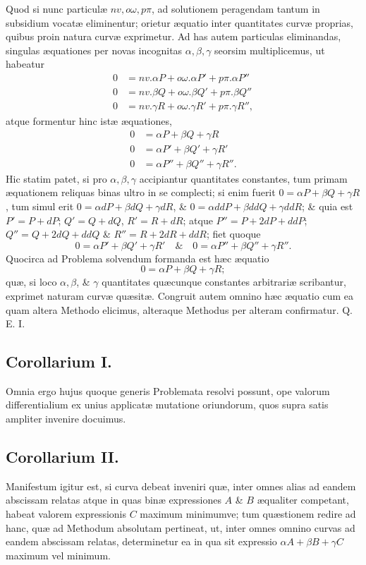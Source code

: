 Quod si nunc particulæ $nv,o\omega,p\pi$, ad solutionem peragendam tantum in subsidium vocatæ eliminentur; orietur æquatio inter quantitates curvæ proprias, quibus proin natura curvæ exprimetur. Ad has autem particulas eliminandas, singulas æquationes per novas incognitas $\alpha,\beta,\gamma$ seorsim multiplicemus, ut habeatur
\[\begin{aligned}
0&=nv.\alpha P+o\omega.\alpha P'+p\pi.\alpha P''\\
0&=nv.\beta Q+o\omega.\beta Q'+p\pi.\beta Q''\\
0&=nv.\gamma R+o\omega.\gamma R'+p\pi.\gamma R'',
\end{aligned}\]
atque formentur hinc istæ æquationes,
\[\begin{aligned}
0&=\alpha P+\beta Q+\gamma R\\
0&=\alpha P'+\beta Q'+\gamma R'\\
0&=\alpha P''+\beta Q''+\gamma R''.
\end{aligned}\]
Hic statim patet, si pro $\alpha,\beta,\gamma$ accipiantur quantitates constantes, tum primam æquationem reliquas binas ultro in se complecti; si enim fuerit $0=\alpha P+\beta Q+\gamma R$, tum simul erit $0=\alpha dP+\beta dQ+\gamma dR$, \& $0=\alpha ddP+\beta ddQ+\gamma ddR$;
\& quia est $P'=P+dP$; $Q'=Q+dQ$, $R'=R+dR$; atque $P''=P+2dP+ddP$; $Q''=Q+2dQ+ddQ$ \& $R''=R+2dR+ddR$; fiet quoque
\[0=\alpha P'+\beta Q'+\gamma R'\quad\&\quad 0=\alpha P''+\beta Q''+\gamma R''.\]
Quocirca ad Problema solvendum formanda est hæc æquatio
\[0=\alpha P+\beta Q+\gamma R;\]
quæ, si loco $\alpha,\beta$, \& $\gamma$ quantitates quæcunque constantes arbitrariæ scribantur, exprimet naturam curvæ quæsitæ. Congruit autem omnino hæc æquatio cum ea quam altera Methodo elicimus, alteraque Methodus per alteram confirmatur. Q. E. I.
\subsection*{Corollarium I.}
Omnia ergo hujus quoque generis Problemata resolvi possunt, ope valorum differentialium ex unius applicatæ mutatione oriundorum, quos supra satis ampliter invenire docuimus.
\subsection*{Corollarium II.}
Manifestum igitur est, si curva debeat inveniri quæ, inter omnes alias ad eandem abscissam relatas atque in quas binæ expressiones $A$ \& $B$ æqualiter competant, habeat valorem expressionis $C$ maximum minimumve; tum quæstionem redire ad hanc, quæ ad Methodum absolutam pertineat, ut, inter omnes omnino curvas ad eandem abscissam relatas, determinetur ea in qua sit expressio $\alpha A+\beta B+\gamma C$ maximum vel minimum.
